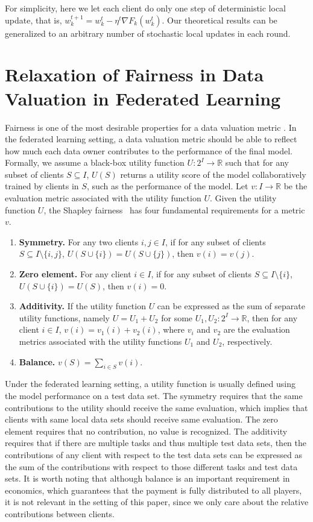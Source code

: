 For simplicity, here we let each client do only one step of deterministic local update, that is, $w_k^{t+1} = w_k^t - \eta^t \nabla F_k(w_k^t)$. Our theoretical results can be generalized to an arbitrary number of stochastic local updates in each round. 

\section{Relaxation of Fairness in Data Valuation in Federated Learning} \label{sec:fair}

Fairness is one of the most desirable properties for a data valuation metric \cite{ghorbani2019data,pei2020survey}. In the federated learning setting, a data valuation metric should be able to reflect how much each data owner contributes to the performance of the final model. Formally, we assume a black-box utility function $U:2^I \to \mathbb{R}$ such that for any subset of clients $S \subseteq I$, $U(S)$ returns a utility score of the model collaboratively trained by clients in $S$, such as the performance of the model. Let $v: I \to \mathbb{R}$ be the evaluation metric associated with the utility function $U$. Given the utility function $U$,  the Shapley fairness~\cite{shapley201617} has four fundamental requirements for a metric $v$.
\begin{enumerate}
    \item \textbf{Symmetry.} For any two clients $i, j \in I$, if for any subset of clients $S \subseteq I \setminus \{i,j\}$, $U(S \cup \{i\}) = U(S \cup \{j\})$, then $v(i) = v(j)$. 
    \item \textbf{Zero element.} For any client $i \in I$, if for any subset of clients $S \subseteq I \setminus \{i\}$, $U(S \cup \{i\}) = U(S)$, then $v(i) = 0$.
    \item \textbf{Additivity.} If the utility function $U$ can be expressed as the sum of separate utility functions, namely $U = U_1 + U_2$ for some $U_1, U_2 : 2^I \to \mathbb{R}$, then for any client $i \in I$, $v(i) = v_1(i) + v_2(i)$, where $v_i$ and $v_2$ are the evaluation metrics associated with the utility functions $U_1$ and $U_2$, respectively. 
    \item \textbf{Balance.}  $v(S) = \sum_{i \in S} v(i)$.
\end{enumerate}

Under the federated learning setting, a utility function is usually defined using the model performance on a test data set. The symmetry requires that the same contributions to the utility should receive the same evaluation, which implies that clients with same local data sets should receive same evaluation. The zero element requires that no contribution, no value is recognized. The additivity requires that if there are multiple tasks and thus multiple test data sets, then the contributions of any client with respect to the test data sets can be expressed as the sum of the contributions with respect to those different tasks and test data sets. It is worth noting that although balance is an important requirement in economics, which guarantees that the payment is fully distributed to all players, it is not relevant in the setting of this paper, since we only care about the relative contributions between clients. 

